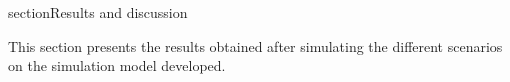 section{Results and discussion}

This section presents the results obtained after simulating the different scenarios on the simulation model developed.  